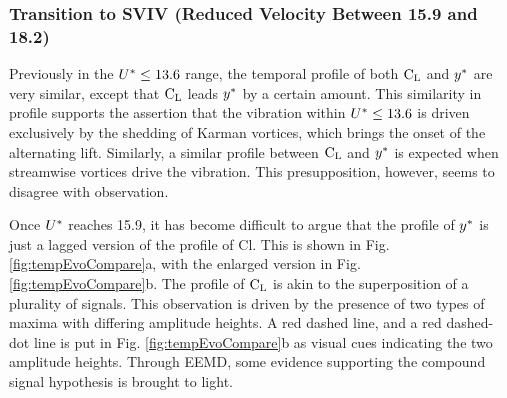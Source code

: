 \documentclass[oneside]{utmthesis}
\begin{document}
\subsubsection{Transition to SVIV (Reduced Velocity Between 15.9 and 18.2)} \label{sssec:transSVIV}

Previously in the $U^{*} \leq 13.6$ range, the temporal profile of both $\text{C}_{\text{L}}$ and  $y^{*}$ are very similar, except that $\text{C}_{\text{L}}$ leads $y^{*}$ by a certain amount. This similarity in profile supports the assertion that the vibration within $U^{*} \leq 13.6$ is driven exclusively by the shedding of Karman vortices, which brings the onset of the alternating lift. Similarly, a similar profile between $\text{C}_{\text{L}}$ and $y^{*}$ is expected when streamwise vortices drive the vibration. This presupposition, however, seems to disagree with observation.

Once $U^{*}$ reaches 15.9, it has become difficult to argue that the profile of $y^{*}$ is just a lagged version of the profile of Cl. This is shown in Fig. \ref{fig:tempEvoCompare}a, with the enlarged version in Fig. \ref{fig:tempEvoCompare}b. The profile of $\text{C}_{\text{L}}$ is akin to the superposition of a plurality of signals. This observation is driven by the presence of two types of maxima with differing amplitude heights. A red dashed line, and a red dashed-dot line is put in Fig. \ref{fig:tempEvoCompare}b as visual cues indicating the two amplitude heights. Through EEMD, some evidence supporting the compound signal hypothesis is brought to light.
\end{document}
